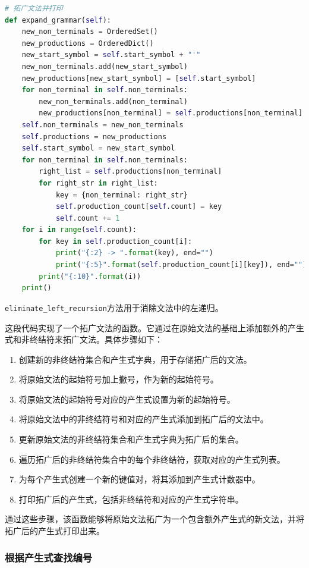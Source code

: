 \documentclass[lang=cn,11pt,a4paper]{elegantpaper}
\begin{document}
\begin{lstlisting}[language=Python]
# 拓广文法并打印
def expand_grammar(self):
    new_non_terminals = OrderedSet()
    new_productions = OrderedDict()
    new_start_symbol = self.start_symbol + "'"
    new_non_terminals.add(new_start_symbol)
    new_productions[new_start_symbol] = [self.start_symbol]
    for non_terminal in self.non_terminals:
        new_non_terminals.add(non_terminal)
        new_productions[non_terminal] = self.productions[non_terminal]
    self.non_terminals = new_non_terminals
    self.productions = new_productions
    self.start_symbol = new_start_symbol
    for non_terminal in self.non_terminals:
        right_list = self.productions[non_terminal]
        for right_str in right_list:
            key = {non_terminal: right_str}
            self.production_count[self.count] = key
            self.count += 1
    for i in range(self.count):
        for key in self.production_count[i]:
            print("{:2} -> ".format(key), end="")
            print("{:5}".format(self.production_count[i][key]), end="")
        print("{:10}".format(i))
    print()
\end{lstlisting}


\lstinline{eliminate_left_recursion}方法用于消除文法中的左递归。


这段代码实现了一个拓广文法的函数。它通过在原始文法的基础上添加额外的产生式和非终结符来拓广文法。具体步骤如下：
\begin{enumerate}
    \item 创建新的非终结符集合和产生式字典，用于存储拓广后的文法。
    \item 将原始文法的起始符号加上撇号，作为新的起始符号。
    \item 将原始文法的起始符号对应的产生式设置为新的起始符号。
    \item 将原始文法中的非终结符号和对应的产生式添加到拓广后的文法中。
    \item 更新原始文法的非终结符集合和产生式字典为拓广后的集合。
    \item 遍历拓广后的非终结符集合中的每个非终结符，获取对应的产生式列表。
    \item 为每个产生式创建一个新的键值对，将其添加到产生式计数器中。
    \item 打印拓广后的产生式，包括非终结符和对应的产生式字符串。
\end{enumerate}

通过这些步骤，该函数能够将原始文法拓广为一个包含额外产生式的新文法，并将拓广后的产生式打印出来。

\subsubsection{根据产生式查找编号}
\end{document}
